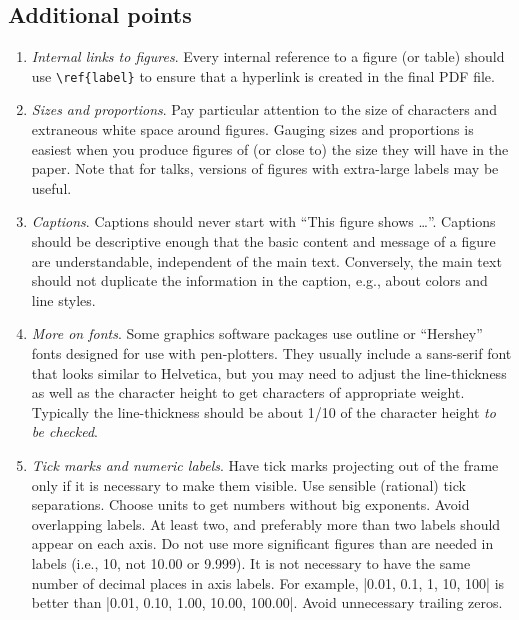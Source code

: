 \documentclass[letterpaper,11pt]{article}
\begin{document}
\subsection{Additional points}

\begin{enumerate}

\item {\it Internal links to figures\/}.  Every internal reference to a figure (or table) should use
\verb|\ref{label}| to ensure that a hyperlink is created in the final PDF file.

\item {\it Sizes and proportions\/}. Pay particular attention to the size of characters and
extraneous white space around figures.  Gauging sizes and proportions is easiest when you produce figures of (or close to) the size they will have in the paper.  Note that for talks, versions of figures with extra-large labels may be useful.

\item {\it Captions\/}.  Captions should never start with ``This figure shows \dots''.  Captions should be descriptive enough that the basic content and message of a figure are understandable, independent of the main text.  Conversely, the main text should not duplicate the information in the caption, e.g., about colors and line styles.

\item {\it More on fonts\/}.  Some graphics software packages use outline or
``Hershey'' fonts designed for use with pen-plotters.  They usually include a
sans-serif font that looks similar to Helvetica, but you may need to adjust
the line-thickness as well as the character height to get characters of
appropriate weight.  Typically the line-thickness should be about 1/10 of the
character height  {\it to be checked}.

\item {\it Tick marks and numeric labels\/}. Have tick marks projecting out of
the frame only if it is necessary to make them visible.  Use sensible
(rational) tick separations.  Choose units to get numbers without big
exponents.  Avoid overlapping labels.  At least two, and preferably more than
two labels should appear on each axis.  Do not use more significant figures
than are needed in labels (i.e., 10, not 10.00 or 9.999).  It is not necessary
to have the same number of decimal places in axis labels.  For example,
|0.01, 0.1, 1, 10, 100| is better than |0.01, 0.10, 1.00, 10.00, 100.00|.
Avoid unnecessary trailing zeros.


\end{enumerate}
\end{document}
